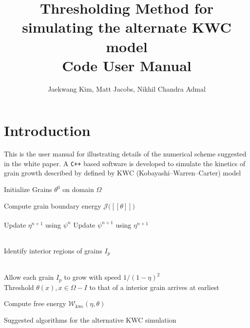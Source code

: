 \documentclass[11pt]{article}
\begin{document}
\title{Thresholding Method for simulating the alternate KWC model\\ Code User Manual}
\author{Jaekwang Kim, Matt Jacobs, Nikhil Chandra Admal} 

\maketitle 
\sectionfont{\fontsize{14}{14}\selectfont}

\normalsize

\section{Introduction}

This is the user manual for illustrating details of 
the numerical scheme suggested in the white paper.
A \texttt{C++} based software is developed
to simulate the kinetics of grain growth described by   
defined by KWC (Kobayashi--Warren--Carter) model~\cite{KWC:1998,KWC:2001,KWC:2003}

\begin{algorithm}
    \small
    
    Initialize Grains $\theta^{0}$ on domain $\Omega$\\
     {
    Compute grain boundary energy $\mathcal{J} \big( [\![ \theta ]\!] \big)$\\
    
    \hfill\linebreak     
    \\
    
    {
    Update $\eta^{n+1}$ using $\psi^{n}$  
    Update $\psi^{n+1}$ using $\eta^{n+1}$  
    }
     
    \hfill\linebreak    
    \\
    
    Identify interior regions of grains $I_p$ 
    
    \quad\quad  {}\\
    \quad\quad Allow each grain $I_p$ to grow with speed $1/(1-\eta)^2$\\
    \quad\quad Threshold $\theta(x), x\in \Omega-I$ to that of a interior grain arrives at earliest  
     
    \hfill\linebreak
    Compute free energy $\mathcal{W}_{\mathrm{kwc}}(\eta,\theta)$\\

    } %
    \caption{Suggested algorithms for the alternative KWC simulation}
    \label{algorithm:KWC}
\end{algorithm}
\end{document}

